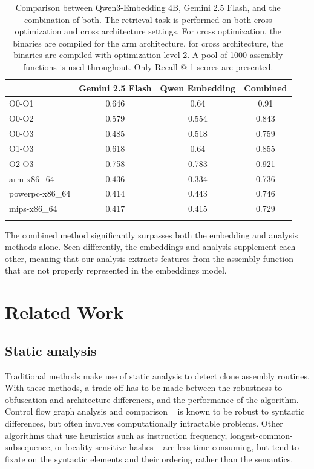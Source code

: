 \documentclass[conference,compsoc]{IEEEtran}
\begin{document}
{
\renewcommand{\arraystretch}{1.3}
\begin{table}[htbp]
\begin{tabular}{l|c|c|c}
\Xhline{2\arrayrulewidth}
                & Gemini 2.5 Flash & Qwen Embedding & Combined \\ \hline
O0-O1           & 0.646            & 0.64           & 0.91     \\
O0-O2           & 0.579            & 0.554          & 0.843    \\
O0-O3           & 0.485            & 0.518          & 0.759    \\
O1-O3           & 0.618            & 0.64           & 0.855    \\
O2-O3           & 0.758            & 0.783          & 0.921    \\
arm-x86\_64     & 0.436            & 0.334          & 0.736    \\
powerpc-x86\_64 & 0.414            & 0.443          & 0.746    \\
mips-x86\_64    & 0.417            & 0.415          & 0.729    \\ \Xhline{2\arrayrulewidth}
\end{tabular}
\caption{Comparison between Qwen3-Embedding 4B, Gemini 2.5 Flash, and the combination of both. The retrieval task is performed on both cross
optimization and cross architecture settings. For cross optimization, the binaries are compiled for the arm architecture, for cross architecture,
the binaries are compiled with optimization level 2. A pool of 1000 assembly functions is used throughout. Only Recall @ 1 scores are presented.}
\end{table}
}

The combined method significantly surpasses both the embedding and analysis methods alone. Seen differently, the embeddings and analysis supplement
each other, meaning that our analysis extracts features from the assembly function that are not properly represented in the embeddings model.

\section{Related Work}

\subsection{Static analysis}

Traditional methods make use of static analysis to detect clone assembly routines. With these methods, a trade-off has
to be made between the robustness to obfuscation and architecture differences, and the performance of the algorithm. ~\cite{BCSDsurvey}
Control flow graph analysis and comparison ~\cite{BinDiff,graph-bug-search} is known to be robust to syntactic differences, but often
involves computationally intractable problems. Other algorithms that use heuristics such as instruction frequency,
longest-common-subsequence, or locality sensitive hashes ~\cite{clones.net,op-seq,sem-hash} are less time consuming, but tend to fixate on the syntactic
elements and their ordering rather than the semantics.
\end{document}
